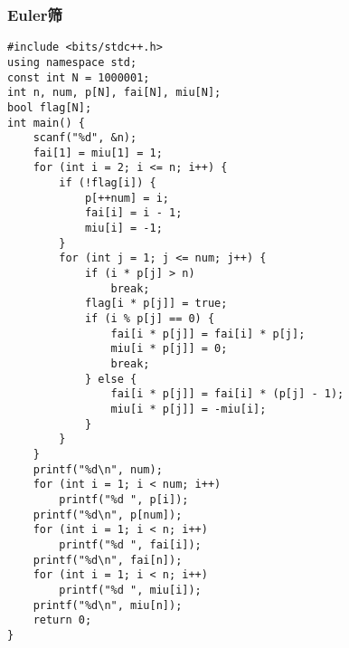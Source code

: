 ﻿\documentclass[a4paper]{article}
\begin{document}
\subsubsection{Euler筛}
\begin{lstlisting}
#include <bits/stdc++.h>
using namespace std;
const int N = 1000001;
int n, num, p[N], fai[N], miu[N];
bool flag[N];
int main() {
    scanf("%d", &n);
    fai[1] = miu[1] = 1;
    for (int i = 2; i <= n; i++) {
        if (!flag[i]) {
            p[++num] = i;
            fai[i] = i - 1;
            miu[i] = -1;
        }
        for (int j = 1; j <= num; j++) {
            if (i * p[j] > n)
                break;
            flag[i * p[j]] = true;
            if (i % p[j] == 0) {
                fai[i * p[j]] = fai[i] * p[j];
                miu[i * p[j]] = 0;
                break;
            } else {
                fai[i * p[j]] = fai[i] * (p[j] - 1);
                miu[i * p[j]] = -miu[i];
            }
        }
    }
    printf("%d\n", num);
    for (int i = 1; i < num; i++)
        printf("%d ", p[i]);
    printf("%d\n", p[num]);
    for (int i = 1; i < n; i++)
        printf("%d ", fai[i]);
    printf("%d\n", fai[n]);
    for (int i = 1; i < n; i++)
        printf("%d ", miu[i]);
    printf("%d\n", miu[n]);
    return 0;
}
\end{lstlisting}
\end{document}
